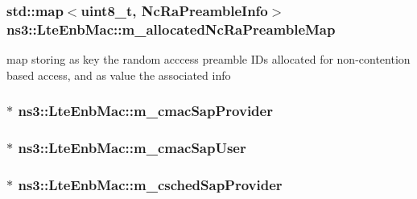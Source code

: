 \subsubsection[{\texorpdfstring{m\+\_\+allocated\+Nc\+Ra\+Preamble\+Map}{m_allocatedNcRaPreambleMap}}]{\setlength{\rightskip}{0pt plus 5cm}std\+::map$<$uint8\+\_\+t, {\bf Nc\+Ra\+Preamble\+Info}$>$ ns3\+::\+Lte\+Enb\+Mac\+::m\+\_\+allocated\+Nc\+Ra\+Preamble\+Map\hspace{0.3cm}{\ttfamily [private]}}\hypertarget{classns3_1_1LteEnbMac_aa4d985440ec2e62eb521203a8e96e901}{}\label{classns3_1_1LteEnbMac_aa4d985440ec2e62eb521203a8e96e901}
map storing as key the random acccess preamble I\+Ds allocated for non-\/contention based access, and as value the associated info 
\subsubsection[{\texorpdfstring{m\+\_\+cmac\+Sap\+Provider}{m_cmacSapProvider}}]{$\ast$ ns3\+::\+Lte\+Enb\+Mac\+::m\+\_\+cmac\+Sap\+Provider\hspace{0.3cm}{\ttfamily [private]}}\hypertarget{classns3_1_1LteEnbMac_a7660977d320cbdd9be4b26f27aa6c515}{}\label{classns3_1_1LteEnbMac_a7660977d320cbdd9be4b26f27aa6c515}
\subsubsection[{\texorpdfstring{m\+\_\+cmac\+Sap\+User}{m_cmacSapUser}}]{$\ast$ ns3\+::\+Lte\+Enb\+Mac\+::m\+\_\+cmac\+Sap\+User\hspace{0.3cm}{\ttfamily [private]}}\hypertarget{classns3_1_1LteEnbMac_adc8aeb0583200cc4a0923dc445a61cf2}{}\label{classns3_1_1LteEnbMac_adc8aeb0583200cc4a0923dc445a61cf2}
\subsubsection[{\texorpdfstring{m\+\_\+csched\+Sap\+Provider}{m_cschedSapProvider}}]{$\ast$ ns3\+::\+Lte\+Enb\+Mac\+::m\+\_\+csched\+Sap\+Provider\hspace{0.3cm}{\ttfamily [private]}}\hypertarget{classns3_1_1LteEnbMac_a0d1bd5af32f8b78f2c8ff493560d3fca}{}\label{classns3_1_1LteEnbMac_a0d1bd5af32f8b78f2c8ff493560d3fca}

